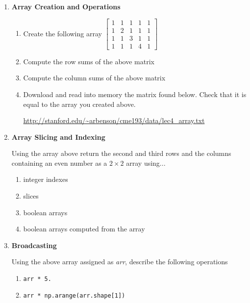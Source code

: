 \documentclass{article}
\begin{document}
\pagestyle{fancy}
\begin{enumerate}

\item \textbf{Array Creation and Operations}
\begin{enumerate}
\item 
Create the following array
$\begin{bmatrix}
1 & 1 & 1 & 1 & 1\\
1 & 2 & 1 & 1 & 1\\
1 & 1 & 3 & 1 & 1\\
1 & 1 & 1 & 4 & 1
\end{bmatrix}$
\item  Compute the row sums of the above matrix 
\item Compute the column sums of the above matrix
\item
Download and read into memory the matrix found below. Check that it is equal to the array you created above. 
\begin{center}
\url{http://stanford.edu/~arbenson/cme193/data/lec4_array.txt}
\end{center}
\end{enumerate}

\item{\textbf{Array Slicing and Indexing}}

Using the array above return the second and third rows and the columns containing an even number as a $2 \times  2$ array using... 
\begin{enumerate}
\item integer indexes
\item slices
\item boolean arrays
\item boolean arrays computed from the array
\end{enumerate}

\item \textbf{Broadcasting}

Using the above array assigned as \textit{arr}, describe the following operations

\begin{enumerate}


\item 
\begin{verbatim}
arr * 5.
\end{verbatim}


\item 
\begin{verbatim}
arr * np.arange(arr.shape[1])
\end{verbatim}


\end{enumerate}
\end{enumerate}
\end{document}
